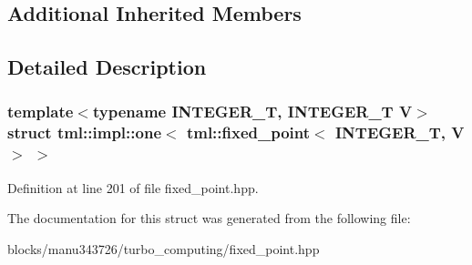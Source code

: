 \subsection*{Additional Inherited Members}


\subsection{Detailed Description}
\subsubsection*{template$<$typename I\+N\+T\+E\+G\+E\+R\+\_\+\+T, I\+N\+T\+E\+G\+E\+R\+\_\+\+T V$>$struct tml\+::impl\+::one$<$ tml\+::fixed\+\_\+point$<$ I\+N\+T\+E\+G\+E\+R\+\_\+\+T, V $>$ $>$}



Definition at line 201 of file fixed\+\_\+point.\+hpp.



The documentation for this struct was generated from the following file\+:\begin{DoxyCompactItemize}
\item 
blocks/manu343726/turbo\+\_\+computing/fixed\+\_\+point.\+hpp\end{DoxyCompactItemize}
